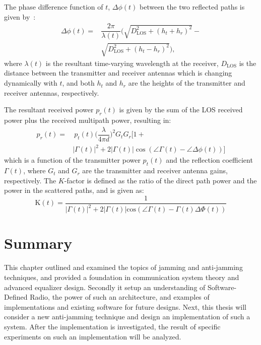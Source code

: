The phase difference function of $t$, $\Delta\phi(t)$ between the two reflected paths is given by~\cite{booklter11}:
\begin{equation}
\begin{split}
\Delta\phi(t) =& \dfrac{2\pi}{\lambda(t)}\bigg(\sqrt{D_{\textrm{LOS}}^2+(h_t+h_r)^2}-\\
& \sqrt{D_{\textrm{LOS}}^2+(h_t-h_r)^2}\bigg),
\end{split}
\end{equation}
where $\lambda(t)$ is the resultant time-varying wavelength at the receiver, $D_{\textrm{LOS}}$ is the distance between the transmitter and receiver antennas which is changing dynamically with $t$, and both $h_t$ and $h_r$ are the heights of the transmitter and receiver antennas, respectively.
 
The resultant received power $p_r(t)$ is given by the sum of the LOS received power plus the received multipath power, resulting in:
\begin{equation}
\begin{split}
p_r(t) =& ~p_t(t)\bigg(\dfrac{\lambda}{4\pi d}\bigg)^2G_t G_r\bigg[1+\\
& |\Gamma(t)|^2+2|\Gamma(t)|\cos(\angle\Gamma(t)-\angle\Delta\phi(t))\bigg]
\end{split}
\end{equation}
which is a function of the transmitter power $p_t(t)$ and the reflection coefficient $\Gamma(t)$, where $G_t$ and $G_r$ are the transmitter and receiver antenna gains,  respectively.
The $K$-factor is defined as the ratio of the direct path power and the power in the scattered paths, and is given as:
\begin{equation}
\label{kfactor}
\mathrm{K}(t) = \dfrac{1}{|\Gamma(t)|^2+2|\Gamma(t)|\textrm{cos}(\angle \Gamma(t)-\Gamma(t)\Delta\Phi(t))}
\end{equation}

\section{Summary}
This chapter outlined and examined the topics of jamming and anti-jamming techniques, and provided a foundation in communication system theory and advanced equalizer design.  Secondly it setup an understanding of Software-Defined Radio, the power of such an architecture, and examples of implementations and existing software for future designs.  Next, this thesis will consider a new anti-jamming technique and design an implementation of such a system.  After the implementation is investigated, the result of specific experiments on such an implementation will be analyzed.\\
